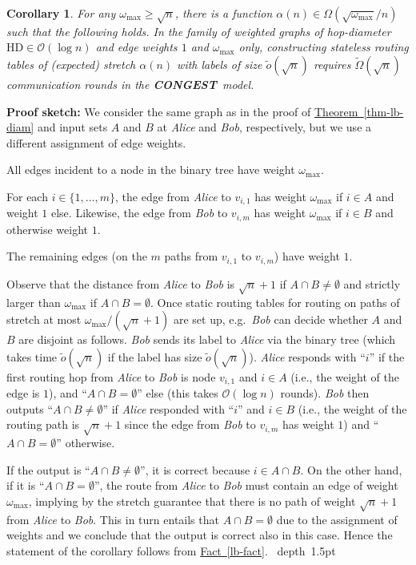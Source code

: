 \documentclass[letterpaper,11pt]{article}
\newcommand{\namedref}[2]{\hyperref[#2]{#1~\ref*{#2}}}
\newcommand{\theoremref}[1]{\namedref{Theorem}{#1}}
\newcommand{\factref}[1]{\namedref{Fact}{#1}}
\newtheorem{corollary}[theorem]{Corollary}
\newcommand{\blackslug}{\hbox{\hskip 1pt \vrule width 4pt height 8pt
depth 1.5pt \hskip 1pt}}
\newcommand{\QED}{\quad\blackslug\lower 8.5pt\null\par}
\newenvironment{proof}[1][Proof:]{\noindent \textbf{#1}\xspace}{\QED}
\newcommand{\BO}{\mathcal{O}}
\newcommand{\CONGEST}{\textbf{CONGEST}}
\newcommand{\HD}{\mathrm{HD}}
\begin{document}
\begin{corollary}\label{coro-lb}
For any $\omega_{\max}\geq \sqrt{n}$, there is a function $\alpha(n)\in
\Omega(\sqrt{\omega_{\max}}/n)$ such that the following holds. In the family of
weighted graphs of hop-diameter $\HD\in \BO(\log n)$ and edge weights $1$
and $\omega_{\max}$ only, constructing stateless routing
tables of (expected) stretch $\alpha(n)$ with labels of size
$\tilde{o}(\sqrt{n})$ requires $\tilde\Omega(\sqrt n)$ communication rounds in
the \CONGEST\ model.
\end{corollary}
\begin{proof}[Proof sketch:] We consider the same graph as in the proof of
\theoremref{thm-lb-diam} and input sets $A$ and $B$ at \emph{Alice} and
\emph{Bob}, respectively, but we use a different assignment of edge weights.
\begin{compactitem}
  \item All edges incident to a node in the binary tree have weight
  $\omega_{\max}$.
  \item For each $i\in \{1,\ldots,m\}$, the edge from \emph{Alice} to $v_{i,1}$
  has weight $\omega_{\max}$ if $i\in A$ and weight $1$ else. Likewise, the edge
  from \emph{Bob} to $v_{i,m}$ has weight $\omega_{\max}$ if $i\in B$ and
  otherwise weight $1$.
  \item The remaining edges (on the $m$ paths from $v_{i,1}$ to $v_{i,m}$) have
  weight $1$.
\end{compactitem}
Observe that the distance from \emph{Alice} to \emph{Bob} is $\sqrt{n}+1$ if
$A\cap B\neq \emptyset$ and strictly larger than $\omega_{\max}$ if $A\cap
B=\emptyset$. Once static routing tables for routing on paths of stretch at most
$\omega_{\max}/(\sqrt{n}+1)$ are set up, e.g.\ \emph{Bob} can decide whether $A$
and $B$ are disjoint as follows. \emph{Bob} sends its label to \emph{Alice} via
the binary tree (which takes time $\tilde{o}(\sqrt{n})$ if the label has size
$\tilde{o}(\sqrt{n})$). \emph{Alice} responds with ``$i$'' if the first
routing hop from \emph{Alice} to \emph{Bob} is node $v_{i,1}$ and $i\in
A$ (i.e., the weight of the edge is $1$), and ``$A\cap B=\emptyset$'' else (this
takes $\BO(\log n)$ rounds). \emph{Bob} then outputs ``$A\cap B\neq \emptyset$''
if \emph{Alice} responded with ``$i$'' and $i\in B$ (i.e., the weight of the
routing path is $\sqrt{n}+1$ since the edge from \emph{Bob} to $v_{i,m}$ has
weight $1$) and ``$A\cap B=\emptyset$'' otherwise.

If the output is ``$A\cap B\neq \emptyset$'', it is correct because $i\in A\cap
B$. On the other hand, if it is ``$A\cap B=\emptyset$'', the route from
\emph{Alice} to \emph{Bob} must contain an edge of weight $\omega_{\max}$,
implying by the stretch guarantee that there is no path of weight $\sqrt{n}+1$
from \emph{Alice} to \emph{Bob}. This in turn entails that $A\cap B=\emptyset$
due to the assignment of weights and we conclude that the output is correct also
in this case. Hence the statement of the corollary follows from
\factref{lb-fact}.
\end{proof}
\end{document}
